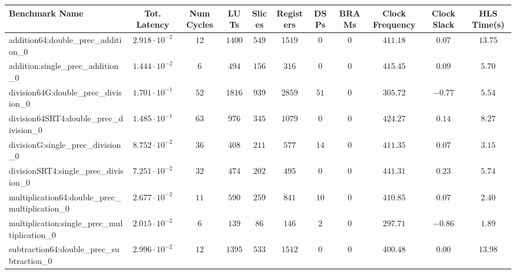 \begin{tabular}{|l|c|c|c|c|c|c|c|c|c|c|}
\hline
Benchmark Name                                   & Tot. Latency            & Num Cycles & LUTs     & Slices   & Registers & DSPs   & BRAMs & Clock Frequency & Clock Slack & HLS Time(s) \\
\hline
addition64:double\_prec\_addition\_0             & $ 2.918 \cdot 10^{-2} $ & $ 12     $ & $ 1400 $ & $ 549  $ & $ 1519  $ & $ 0  $ & $ 0 $ & $ 411.18      $ & $ 0.07    $ & $ 13.75   $ \\
addition:single\_prec\_addition\_0               & $ 1.444 \cdot 10^{-2} $ & $ 6      $ & $ 494  $ & $ 156  $ & $ 316   $ & $ 0  $ & $ 0 $ & $ 415.45      $ & $ 0.09    $ & $ 5.70    $ \\
division64G:double\_prec\_division\_0            & $ 1.701 \cdot 10^{-1} $ & $ 52     $ & $ 1816 $ & $ 939  $ & $ 2859  $ & $ 51 $ & $ 0 $ & $ 305.72      $ & $ -0.77   $ & $ 5.54    $ \\
division64SRT4:double\_prec\_division\_0         & $ 1.485 \cdot 10^{-1} $ & $ 63     $ & $ 976  $ & $ 345  $ & $ 1079  $ & $ 0  $ & $ 0 $ & $ 424.27      $ & $ 0.14    $ & $ 8.27    $ \\
divisionG:single\_prec\_division\_0              & $ 8.752 \cdot 10^{-2} $ & $ 36     $ & $ 408  $ & $ 211  $ & $ 577   $ & $ 14 $ & $ 0 $ & $ 411.35      $ & $ 0.07    $ & $ 3.15    $ \\
divisionSRT4:single\_prec\_division\_0           & $ 7.251 \cdot 10^{-2} $ & $ 32     $ & $ 474  $ & $ 202  $ & $ 495   $ & $ 0  $ & $ 0 $ & $ 441.31      $ & $ 0.23    $ & $ 5.74    $ \\
multiplication64:double\_prec\_multiplication\_0 & $ 2.677 \cdot 10^{-2} $ & $ 11     $ & $ 590  $ & $ 259  $ & $ 841   $ & $ 10 $ & $ 0 $ & $ 410.85      $ & $ 0.07    $ & $ 2.40    $ \\
multiplication:single\_prec\_multiplication\_0   & $ 2.015 \cdot 10^{-2} $ & $ 6      $ & $ 139  $ & $ 86   $ & $ 146   $ & $ 2  $ & $ 0 $ & $ 297.71      $ & $ -0.86   $ & $ 1.89    $ \\
subtraction64:double\_prec\_subtraction\_0       & $ 2.996 \cdot 10^{-2} $ & $ 12     $ & $ 1395 $ & $ 533  $ & $ 1512  $ & $ 0  $ & $ 0 $ & $ 400.48      $ & $ 0.00    $ & $ 13.98   $ \\

\end{tabular}
